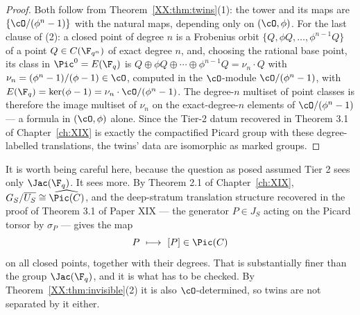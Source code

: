 \begin{proof}
Both follow from Theorem~\ref{XX:thm:twins}(1): the tower and its maps are
$\{\cO/(\phi^n-1)\}$ with the natural maps, depending only on $(\cO,\phi)$. For the last
clause of (2): a closed point of degree $n$ is a Frobenius orbit
$\{Q,\phi Q,\dots,\phi^{n-1}Q\}$ of a point $Q\in C(\F_{q^n})$ of exact degree $n$, and,
choosing the rational base point, its class in $\Pic^0=E(\F_q)$ is
$Q\oplus\phi Q\oplus\cdots\oplus\phi^{n-1}Q=\nu_n\cdot Q$ with
$\nu_n=(\phi^n-1)/(\phi-1)\in\cO$, computed in the $\cO$-module $\cO/(\phi^n-1)$, with
$E(\F_q)=\ker(\phi-1)=\nu_n\cdot\cO/(\phi^n-1)$. The degree-$n$ multiset of point classes is
therefore the image multiset of $\nu_n$ on the exact-degree-$n$ elements of
$\cO/(\phi^n-1)$ --- a formula in $(\cO,\phi)$ alone. Since the Tier-2 datum recovered in
Theorem 3.1 of Chapter~\ref{ch:XIX} is exactly the compactified Picard group with these degree-labelled
translations, the twins' data are isomorphic as marked groups.
\end{proof}

\begin{remark}\label{XX:rem:tier2more}
It is worth being careful here, because the question as posed assumed Tier 2 sees only
$\Jac(\F_q)$. It sees more. By Theorem 2.1 of Chapter~\ref{ch:XIX}, $G_S/\overline{U_S}\cong\widehat{\Pic(C)}$,
and the deep-stratum translation structure recovered in the proof of Theorem 3.1 of Paper
XIX --- the generator $P\in J_S$ acting on the Picard torsor by $\sigma_P$ --- gives the map
\[
P\ \longmapsto\ [P]\in\Pic(C)
\]
on all closed points, together with their degrees. That is
substantially finer than the group $\Jac(\F_q)$, and it is what has to be checked. By
Theorem~\ref{XX:thm:invisible}(2) it is also $\cO$-determined, so twins are not separated by it
either.
\end{remark}

